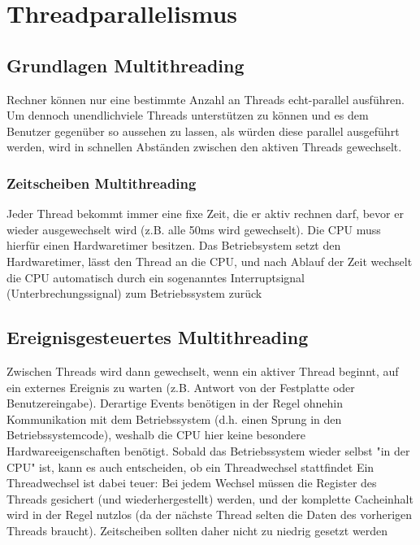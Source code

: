 \section{Threadparallelismus}
	\subsection{Grundlagen Multithreading}
		Rechner können nur eine bestimmte Anzahl an Threads echt-parallel ausführen. Um dennoch \glqq unendlich\grqq  viele Threads unterstützen zu können und es dem Benutzer gegenüber so aussehen zu lassen, als würden diese parallel ausgeführt werden, wird in schnellen Abständen zwischen den aktiven Threads gewechselt.
		\subsubsection{Zeitscheiben Multithreading}
			Jeder Thread bekommt immer eine fixe Zeit, die er aktiv rechnen darf, bevor er wieder ausgewechselt wird (z.B. alle 50ms wird gewechselt). Die CPU muss hierfür einen Hardwaretimer besitzen. Das Betriebsystem setzt den Hardwaretimer, lässt den Thread an die CPU, und nach Ablauf der Zeit wechselt die CPU automatisch durch ein sogenanntes Interruptsignal (Unterbrechungssignal) zum Betriebssystem zurück
		\subsection{Ereignisgesteuertes Multithreading}
			Zwischen Threads wird dann gewechselt, wenn ein aktiver Thread beginnt, auf ein externes Ereignis zu warten (z.B. Antwort von der Festplatte oder Benutzereingabe). Derartige Events benötigen in der Regel ohnehin Kommunikation mit dem Betriebssystem (d.h. einen Sprung in den Betriebssystemcode), weshalb die CPU hier keine besondere Hardwareeigenschaften benötigt. Sobald das Betriebssystem wieder selbst "in der CPU" ist, kann es auch entscheiden, ob ein Threadwechsel stattfindet \newline \newline
			Ein Threadwechsel ist dabei teuer: Bei jedem Wechsel müssen die Register des Threads gesichert (und wiederhergestellt) werden, und der komplette Cacheinhalt wird in der Regel nutzlos (da der nächste Thread selten die Daten des vorherigen Threads braucht). Zeitscheiben sollten daher nicht zu niedrig gesetzt werden
